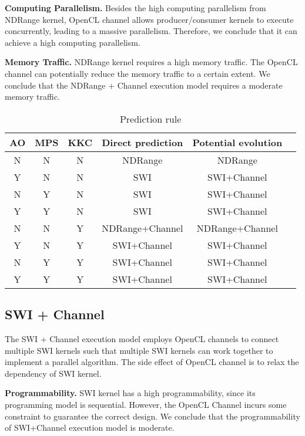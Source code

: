 {\bf Computing Parallelism. }
Besides the high computing parallelism from NDRange kernel, OpenCL channel allows producer/consumer kernels to execute concurrently, leading to a massive parallelism. Therefore, we conclude that it can achieve a high computing parallelism.  

{\bf Memory Traffic. }NDRange kernel requires a high memory traffic. The OpenCL channel can potentially reduce the memory traffic to a certain extent. We conclude that the NDRange + Channel execution model requires a moderate memory traffic. 

\begin{table}%
	\centering
	\begin{scriptsize}
		\begin{tabular}{|c|c|c|c|c|c|}
			\hline
			AO & MPS & KKC & Direct prediction & Potential evolution \\		
			\hline
			N & N & N & NDRange & NDRange  \\
			\hline
			Y & N & N & SWI  & SWI+Channel  \\
			\hline
			N & Y & N & SWI & SWI+Channel  \\
			\hline
			Y & Y & N & SWI & SWI+Channel  \\
			\hline
			N & N & Y & NDRange+Channel & NDRange+Channel \\
			\hline
			Y & N & Y & SWI+Channel & SWI+Channel  \\
			\hline
			N & Y & Y & SWI+Channel & SWI+Channel  \\
			\hline
			Y & Y & Y & SWI+Channel & SWI+Channel \\
			\hline
		\end{tabular}
	\end{scriptsize}
	\caption{Prediction rule}
	\label{t_pattern_to_model}
	\vspace{-6ex}
\end{table}


\vspace{-1ex}
\subsection{SWI + Channel }
The SWI + Channel execution model employs OpenCL channels to connect multiple SWI kernels such that multiple SWI kernels can work together to implement a parallel algorithm. The side effect of OpenCL channel is to relax the dependency of SWI kernel.  

{\bf Programmability. }SWI kernel has a high programmability, since its programming model is sequential. However, the OpenCL Channel incurs some constraint to guarantee the correct design. We conclude that the programmability of SWI+Channel execution model is moderate.

